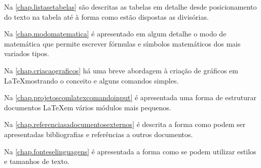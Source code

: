 Na \autoref{chap.listasetabelas} são descritas as tabelas em detalhe desde posicionamento do texto na tabela até à forma como estão dispostas as divisórias.

Na \autoref{chap.modomatematica} é apresentado em algum detalhe o modo de matemática que permite escrever fórmulas e símbolos matemáticos dos mais variados tipos.

Na \autoref{chap.criacaograficos} há uma breve abordagem à criação de gráficos em \LaTeX mostrando o conceito e alguns comandos simples.

Na \autoref{chap.projetoscomlatexcomandoinput} é apresentada uma forma de estruturar documentos \LaTeX em vários módulos mais pequenos.

Na \autoref{chap.referenciasadocumentosexternos} é descrita a forma como podem ser apresentadas bibliografias e referências a outros documentos.

Na \autoref{chap.fonteselinguagens} é apresentada a forma como se podem utilizar estilos e tamanhos de texto.


